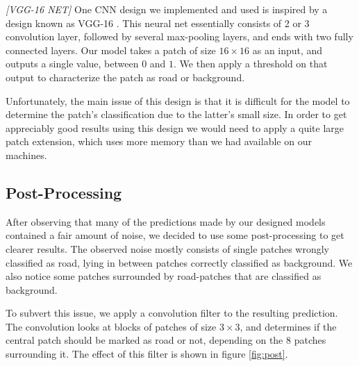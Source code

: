 \documentclass[10pt,conference,compsocconf]{IEEEtran}
\begin{document}
\textit{[VGG-16 NET]}
One CNN design we implemented and used is inspired by a design known as VGG-16 \cite{vgg}. This neural net essentially consists of 2 or 3 convolution layer, followed by several max-pooling layers, and ends with two fully connected layers. Our model takes a patch of size $16 \times 16$ as an input, and outputs a single value, between $0$ and $1$. We then apply a threshold on that output to characterize the patch as road or background.

Unfortunately, the main issue of this design is that it is difficult for the model to determine the patch's classification due to the latter's small size. In order to get appreciably good results using this design we would need to apply a quite large patch extension, which uses more memory than we had available on our machines.


\subsection{Post-Processing} 
\label{ssec:post}

After observing that many of the predictions made by our designed models contained a fair amount of noise, we decided to use some post-processing to get clearer results. The observed noise mostly consists of single patches wrongly classified as road, lying in between patches correctly classified as background. We also notice some patches surrounded by road-patches that are classified as background.

To subvert this issue, we apply a convolution filter to the resulting prediction. The convolution looks at blocks of patches of size $3 \times 3$, and determines if the central patch should be marked as road or not, depending on the $8$ patches surrounding it. The effect of this filter is shown in figure \ref{fig:post}.
\end{document}
